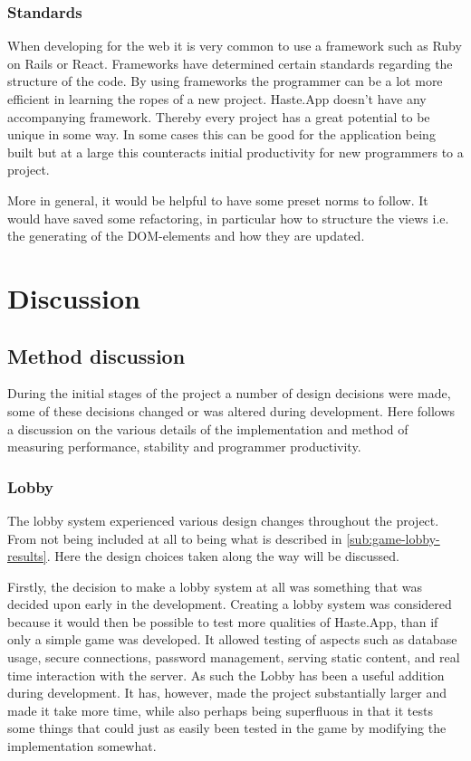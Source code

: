 \documentclass[a4paper]{article}
\begin{document}
\subsubsection{Standards}
When developing for the web it is very common to use a framework such as Ruby on Rails or React. Frameworks have determined certain standards regarding the structure of the code. By using frameworks the programmer can be a lot more efficient in learning the ropes of a new project. Haste.App doesn't have any accompanying framework. Thereby every project has a great potential to be unique in some way. In some cases this can be good for the application being built but at a large this counteracts initial productivity for new programmers to a project.

More in general, it would be helpful to have some preset norms to follow. It would have saved some refactoring, in particular how to structure the views i.e. the generating of the DOM-elements and how they are updated. 

\section{Discussion}
\subsection{Method discussion}
During the initial stages of the project a number of design decisions were made, some of these decisions changed or was altered during development. Here follows a discussion on the various details of the implementation and method of measuring performance, stability and programmer productivity.

\subsubsection{Lobby}
The lobby system experienced various design changes throughout the project. From not being included at all to being what is described in \cref{sub:game-lobby-results}. Here the design choices taken along the way will be discussed.

Firstly, the decision to make a lobby system at all was something that was decided upon early in the development. Creating a lobby system was considered because it would then be possible to test more qualities of Haste.App, than if only a simple game was developed. It allowed testing of aspects such as database usage, secure connections, password management, serving static content, and real time interaction with the server. As such the Lobby has been a useful addition during development. It has, however, made the project substantially larger and made it take more time, while also perhaps being superfluous in that it tests some things that could just as easily been tested in the game by modifying the implementation somewhat. 
\end{document}
